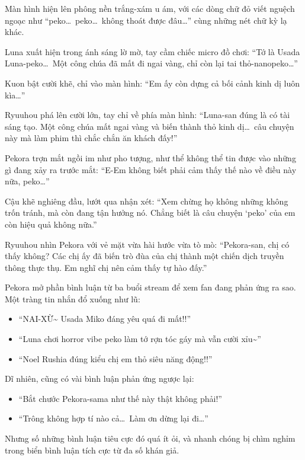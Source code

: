 \documentclass[../main.tex]{subfiles}
\begin{document}
Màn hình hiện lên phông nền trắng-xám u ám, với các dòng chữ đỏ viết nguệch ngoạc như ``peko\dots\ peko\dots\ không thoát được đâu\dots'' cùng những nét chữ kỳ lạ khác.

Luna xuất hiện trong ánh sáng lờ mờ, tay cầm chiếc micro đồ chơi: ``Tớ là Usada Luna-peko\dots\ Một công chúa đã mất đi ngai vàng, chỉ còn lại tai thỏ-nanopeko\dots''


Kuon bật cười khẽ, chỉ vào màn hình: ``Em ấy còn dựng cả bối cảnh kinh dị luôn kìa\dots''

Ryuuhou phá lên cười lớn, tay chỉ về phía màn hình: ``Luna-san đúng là có tài sáng tạo. Một công chúa mất ngai vàng và biến thành thỏ kinh dị\dots\ câu chuyện này mà làm phim thì chắc chắn ăn khách đấy!''

Pekora trợn mắt ngồi im như pho tượng, như thể không thể tin được vào những gì đang xảy ra trước mắt: ``E-Em không biết phải cảm thấy thế nào về điều này nữa, peko\dots''

Cậu khẽ nghiêng đầu, lướt qua nhận xét: ``Xem chừng họ không những không trốn tránh, mà còn đang tận hưởng nó. Chẳng biết là câu chuyện `peko' của em còn hiệu quả không nữa.''

Ryuuhou nhìn Pekora với vẻ mặt vừa hài hước vừa tò mò: ``Pekora-san, chị có thấy không? Các chị ấy đã biến trò đùa của chị thành một chiến dịch truyền thông thực thụ. Em nghĩ chị nên cảm thấy tự hào đấy.''

Pekora mở phần bình luận từ ba buổi stream để xem fan đang phản ứng ra sao. Một tràng tin nhắn đổ xuống như lũ:

\begin{itemize}
  \item ``NAI-XỪ\~{} Usada Miko đáng yêu quá đi mất!!''
  \item ``Luna chơi horror vibe peko làm tớ rợn tóc gáy mà vẫn cười xỉu\~{}''
  \item ``Noel Rushia đúng kiểu chị em thỏ siêu năng động!!''
\end{itemize}

Dĩ nhiên, cũng có vài bình luận phản ứng ngược lại:

\begin{itemize}
  \item ``Bắt chước Pekora-sama như thế này thật không phải!''
  \item ``Trông không hợp tí nào cả\dots\ Làm ơn dừng lại đi\dots''
\end{itemize}

Nhưng số những bình luận tiêu cực đó quá ít ỏi, và nhanh chóng bị chìm nghỉm trong biển bình luận tích cực từ đa số khán giả.
\end{document}
